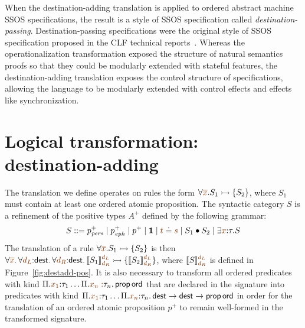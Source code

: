 When the destination-adding translation is applied to ordered abstract
machine SSOS specifications, the result is a style of SSOS
specification called {\it destination-passing}. Destination-passing
specifications were the original style of SSOS specification proposed
in the CLF technical reports~\cite{cervesato02concurrent}. Whereas the
operationalization transformation exposed the structure of natural
semantics proofs so that they could be modularly extended with
stateful features, the destination-adding translation exposes the
control structure of specifications, allowing the language to be
modularly extended with control effects and effects like
synchronization.

\section{Logical transformation: destination-adding}
\label{sec:destination-adding}

The translation we define operates on rules the form $\forall
\lf{\overline{x}}. S_1 \lefti \{ S_2 \}$, where $S_1$ must contain at least
one ordered atomic proposition. The syntactic category $S$ is
a refinement of the positive types $A^+$ defined by the following
grammar:
\[
S ::= p^+_\mpers \mid p^+_\meph \mid p^+ \mid \one
\mid \lf{t} \doteq \lf{s} \mid S_1 \fuse S_2 \mid \exists \lf{x}{:}\tau. S
\]
The translation of a rule $\forall \lf{\overline{x}}. S_1 \lefti \{ S_2 \}$
is then $\forall \lf{\overline{x}}.\, \forall \lf{d_L}{:}{\sf dest}.\, \forall
\lf{d_R}{:}{\sf dest}.\, \llbracket S_1 \rrbracket^{\lf{d_L}}_{\lf{d_R}} \lefti \{
\llbracket S_2 \rrbracket^{\lf{d_L}}_{\lf{d_R}} \}$, where $\llbracket S
\rrbracket^{\lf{d_L}}_{\lf{d_R}}$ is defined in Figure~\ref{fig:destadd-pos}. It
is also necessary to transform all ordered predicates with kind
$\Pi. \lf{x_1}{:}\tau_1\ldots \Pi.\lf{x_n{}:}\tau_n.\,{\sf prop\,ord}$ that are
declared in the signature into predicates with kind
$\Pi. \lf{x_1}{:}\tau_1\ldots \Pi.\lf{x_n}{:}\tau_n.\, {\sf dest} \rightarrow
{\sf dest} \rightarrow {\sf prop\,ord}$ in order for the translation
of an ordered atomic proposition $p^+$ to remain well-formed in
the transformed signature.

